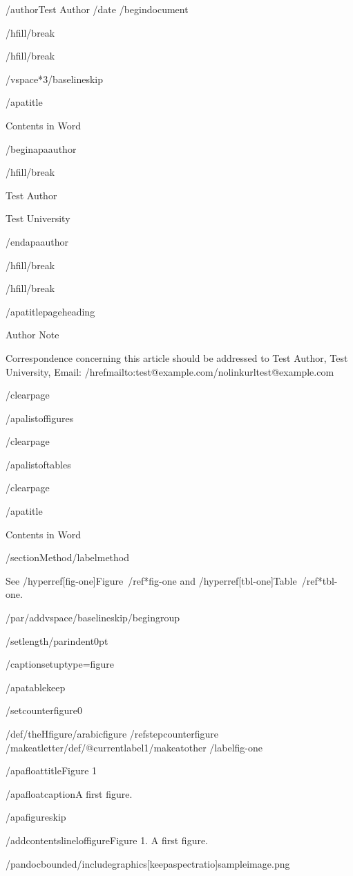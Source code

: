 /author{Test Author}
/date{}
/begin{document}


/hfill/break

/hfill/break

/vspace*{3/baselineskip}

/apatitle{

Contents in Word

}

/begin{apaauthor}

/hfill/break

Test Author

Test University

/end{apaauthor}

/hfill/break

/hfill/break

/apatitlepageheading{

Author Note

}

Correspondence concerning this article should be addressed to Test
Author, Test University, Email:
/href{mailto:test@example.com}{/nolinkurl{test@example.com}}

/clearpage

/apalistoffigures

/clearpage

/apalistoftables

/clearpage

/apatitle{

Contents in Word

}

/section{Method}/label{method}

See /hyperref[fig-one]{Figure~/ref*{fig-one}} and
/hyperref[tbl-one]{Table~/ref*{tbl-one}}.

/par/addvspace{/baselineskip}/begingroup

/setlength{/parindent}{0pt}

/captionsetup{type=figure}

/apatablekeep

/setcounter{figure}{0}

/def/theHfigure{/arabic{figure}}%
/refstepcounter{figure}%
/makeatletter/def/@currentlabel{1}/makeatother%
/label{fig-one}

/apafloattitle{Figure 1}

/apafloatcaption{A first figure.}

/apafigureskip

/addcontentsline{lof}{figure}{Figure 1. A first figure.}

/pandocbounded{/includegraphics[keepaspectratio]{sampleimage.png}}

